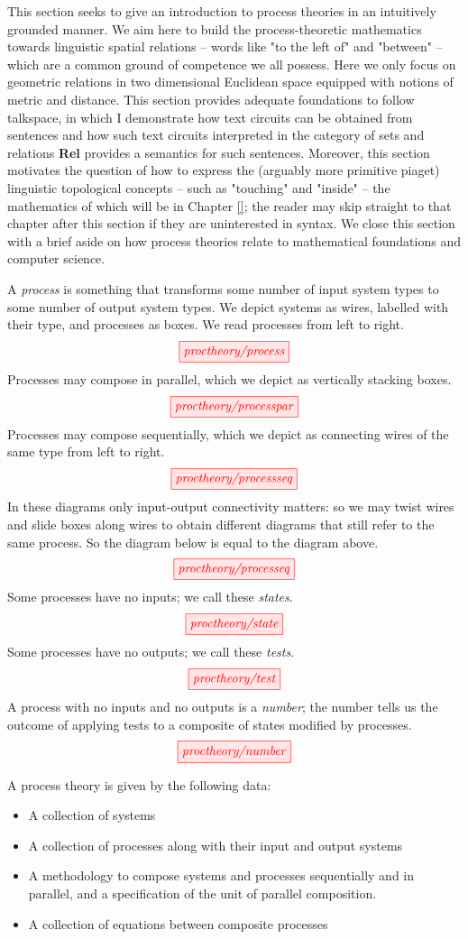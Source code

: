 This section seeks to give an introduction to process theories in an intuitively grounded manner. We aim here to build the process-theoretic mathematics towards linguistic spatial relations -- words like "to the left of" and "between" -- which are a common ground of competence we all possess. Here we only focus on geometric relations in two dimensional Euclidean space equipped with notions of metric and distance. This section provides adequate foundations to follow \citep{}talkspace, in which I demonstrate how text circuits can be obtained from sentences and how such text circuits interpreted in the category of sets and relations \textbf{Rel} provides a semantics for such sentences. Moreover, this section motivates the question of how to express the (arguably more primitive \citep{}piaget) linguistic topological concepts -- such as "touching" and "inside" -- the mathematics of which will be in Chapter \ref{}; the reader may skip straight to that chapter after this section if they are uninterested in syntax. We close this section with a brief aside on how process theories relate to mathematical foundations and computer science.

A \emph{process} is something that transforms some number of input system types to some number of output system types. We depict systems as wires, labelled with their type, and processes as boxes. We read processes from left to right.
\[\tikzfig{proctheory/process}\]
Processes may compose in parallel, which we depict as vertically stacking boxes.
\[\tikzfig{proctheory/processpar}\]
Processes may compose sequentially, which we depict as connecting wires of the same type from left to right.
\[\tikzfig{proctheory/processseq}\]
In these diagrams only input-output connectivity matters: so we may twist wires and slide boxes along wires to obtain different diagrams that still refer to the same process. So the diagram below is equal to the diagram above.
\[\tikzfig{proctheory/processeq}\]
Some processes have no inputs; we call these \emph{states}. 
\[\tikzfig{proctheory/state}\]
Some processes have no outputs; we call these \emph{tests}.
\[\tikzfig{proctheory/test}\]
A process with no inputs and no outputs is a \emph{number}; the number tells us the outcome of applying tests to a composite of states modified by processes.
\[\tikzfig{proctheory/number}\]

A process theory is given by the following data:
\begin{itemize}
    \item A collection of systems
    \item A collection of processes along with their input and output systems
    \item A methodology to compose systems and processes sequentially and in parallel, and a specification of the unit of parallel composition.
    \item A collection of equations between composite processes
\end{itemize}

